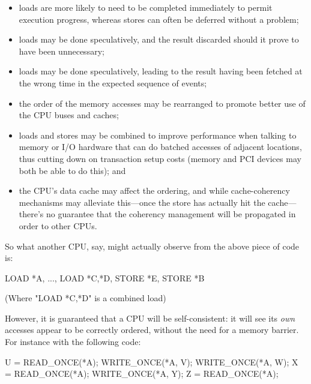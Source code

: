 \begin{itemize}
 \item
     loads are more likely to need to be completed immediately to permit
     execution progress, whereas stores can often be deferred without a
     problem;

 \item
     loads may be done speculatively, and the result discarded should it prove
     to have been unnecessary;

 \item
     loads may be done speculatively, leading to the result having been fetched
     at the wrong time in the expected sequence of events;

 \item
     the order of the memory accesses may be rearranged to promote better use
     of the CPU buses and caches;

 \item
     loads and stores may be combined to improve performance when talking to
     memory or I/O hardware that can do batched accesses of adjacent locations,
     thus cutting down on transaction setup costs (memory and PCI devices may
     both be able to do this); and

 \item
     the CPU's data cache may affect the ordering, and while cache-coherency
     mechanisms may alleviate this---once the store has actually hit the
     cache---there's no guarantee that the coherency management will be
     propagated in order to other CPUs.
\end{itemize}

So what another CPU, say, might actually observe from the above piece of code
is:

\begin{VerbatimU}
	LOAD *A, ..., LOAD {*C,*D}, STORE *E, STORE *B

	(Where "LOAD {*C,*D}" is a combined load)
\end{VerbatimU}

However, it is guaranteed that a CPU will be self-consistent: it will see its
\emph{own} accesses appear to be correctly ordered, without the need for a
memory barrier.
For instance with the following code:

\begin{VerbatimU}
	U = READ_ONCE(*A);
	WRITE_ONCE(*A, V);
	WRITE_ONCE(*A, W);
	X = READ_ONCE(*A);
	WRITE_ONCE(*A, Y);
	Z = READ_ONCE(*A);
\end{VerbatimU}

